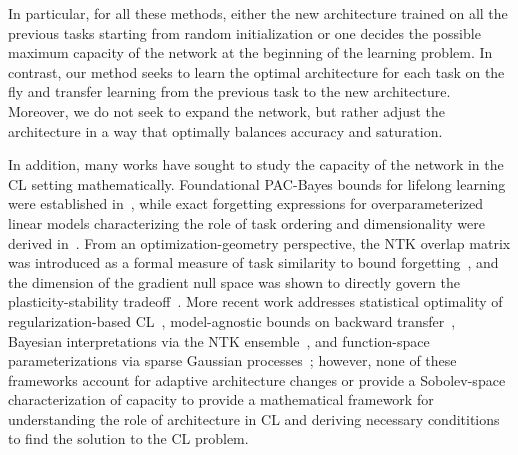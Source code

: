 In particular, for all these methods, either the new architecture trained on all the previous tasks starting from random initialization or one decides the possible maximum capacity of the network at the beginning of the learning problem. In contrast, our method seeks to learn the optimal architecture for each task on the fly and transfer learning from the previous task to the new architecture. Moreover, we do not seek to expand the network, but rather adjust the architecture in a way that optimally balances accuracy and saturation.


In addition, many works have sought to study the capacity of the network in the CL setting mathematically. Foundational PAC-Bayes bounds for lifelong learning were established in~\cite{Pentina2014PACBayes}, while exact forgetting expressions for overparameterized linear models characterizing the role of task ordering and dimensionality were derived in~\cite{Evron2022Catastrophic,Lin2023Theory}. From an optimization-geometry perspective, the NTK overlap matrix was introduced as a formal measure of task similarity to bound forgetting~\cite{Doan2021NTK}, and the dimension of the gradient null space was shown to directly govern the plasticity-stability tradeoff~\cite{Kong2022NullSpace}. More recent work addresses statistical optimality of regularization-based CL~\cite{Zhao2024Statistical}, model-agnostic bounds on backward transfer~\cite{Friedman2025Forgetting}, Bayesian interpretations via the NTK ensemble~\cite{Benjamin2024NTEnsemble}, and function-space parameterizations via sparse Gaussian processes~\cite{Scannell2024FunctionSpace}; however, none of these frameworks account for adaptive architecture changes or provide a Sobolev-space characterization of capacity to provide a mathematical framework for understanding the role of architecture in CL and deriving necessary condititions to find the solution to the CL problem. 






